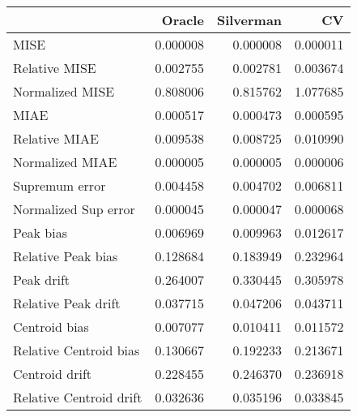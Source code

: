 \begin{tabular}{lrrr}
  \toprule
 & Oracle & Silverman & CV \\ 
  \midrule
MISE & 0.000008 & 0.000008 & 0.000011 \\ 
  Relative MISE & 0.002755 & 0.002781 & 0.003674 \\ 
  Normalized MISE & 0.808006 & 0.815762 & 1.077685 \\ 
  MIAE & 0.000517 & 0.000473 & 0.000595 \\ 
  Relative MIAE & 0.009538 & 0.008725 & 0.010990 \\ 
  Normalized MIAE & 0.000005 & 0.000005 & 0.000006 \\ 
  Supremum error & 0.004458 & 0.004702 & 0.006811 \\ 
  Normalized Sup error & 0.000045 & 0.000047 & 0.000068 \\ 
  Peak bias & 0.006969 & 0.009963 & 0.012617 \\ 
  Relative Peak bias & 0.128684 & 0.183949 & 0.232964 \\ 
  Peak drift & 0.264007 & 0.330445 & 0.305978 \\ 
  Relative Peak drift & 0.037715 & 0.047206 & 0.043711 \\ 
  Centroid bias & 0.007077 & 0.010411 & 0.011572 \\ 
  Relative Centroid bias & 0.130667 & 0.192233 & 0.213671 \\ 
  Centroid drift & 0.228455 & 0.246370 & 0.236918 \\ 
  Relative Centroid drift & 0.032636 & 0.035196 & 0.033845 \\ 
   \bottomrule
\end{tabular}
